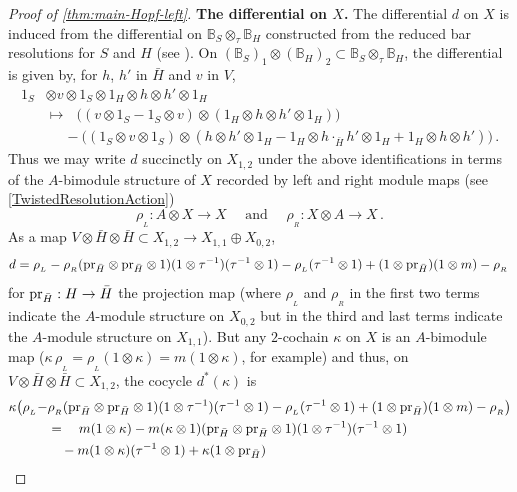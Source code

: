 \documentclass[11pt]{amsart}
\numberwithin{equation}{section}
\newcommand{\X}{_X}
\newcommand{\gammax}{\kappa} %
\newcommand{\pr}{ {\rm{pr}} }%
\newcommand{\BB}{\mathbb{B}} %
\newcommand{\itau}{{\tau^{-1}}}%
\renewcommand{\_}[1]{\mbox{$_{\left( #1 \right)}$}}
\newcommand{\ot}{\otimes}
\newcommand{\ott}{\otimes_{\tau}}
\begin{document}
{\begin{proof}[Proof of \cref{thm:main-Hopf-left}]
{\bf The differential on $X$.}
The differential $d$ on
$X$ is induced
from the differential on
$\BB_S\ott \BB_H$ constructed from the reduced bar resolutions for $S$
and $H$ (see \cite{TTP-AWEZ}).
On $(\BB_S)_1\ot (\BB_H)_2\subset \BB_S\ott \BB_H$,
the differential is given by,
for $h$, $h'$ in $\bar H$ and $v$ in $V$,
$$
\begin{aligned}
 1_S &\ot v\ot 1_S \ot 1_H \ot h\ot h'\ot 1_H
  \\& \longmapsto\ \ \
\big( (v\ot 1_S-1_S\ot v) \ot (1_H\ot h\ot h'\ot 1_H)\big) 
\\&\ \ \ \ \ \
-\big( (1_S\ot v\ot 1_S)\ot (h\ot h'\ot 1_H 
- 1_H\ot h\cdot_{\bar H} h'\ot 1_H+1_H\ot h\ot h')\big)
\, .
\end{aligned}
$$
%
Thus we may write $d$ succinctly on $X_{1,2}$ under the above
identifications
in terms of the $A$-bimodule structure of $X$ recorded by 
left and right module maps
(see \cref{TwistedResolutionAction})
$$\rho_{_L}:A\ot X\rightarrow X
\quad\text{ and }\quad
\rho_{_R}: X\ot A\rightarrow X
\, .
$$
As a map $V\ot \bar H\ot \bar H\subset X_{1,2}\rightarrow
X_{1,1}\oplus X_{0,2}$,
\begin{equation}\label{d}
\begin{aligned}
  d =
  \rho_{_L}-
  \rho_{_R}(\pr_{\bar H}\ot \pr_{\bar H}\ot 1)
  (1\ot\itau)(\itau\ot 1) 
  - \rho_{_L}(\itau\ot 1)+ (1\ot \pr_{\bar H})
  ( 1\ot m)-\rho_{_R} 
\, 
\end{aligned}
\end{equation}
for $\pr_{\bar H}: H\rightarrow \bar H$ the projection map
(where $\rho_{_L}$ and $\rho_{_R}$ in the first two terms
indicate the $A$-module structure on $X_{0,2}$
but in the third and last terms
indicate the $A$-module structure on $X_{1,1}$).
But any $2$-cochain $\gammax$ on $X$
is an $A$-bimodule map
($\gammax\,\rho_{_L}=\rho_{_L}(1\ot \gammax) 
=m(1\ot \gammax)$, for example) and 
thus, on $V\ot \bar H\ot \bar H\subset X_{1,2}$,
the cocycle
$d^*(\gammax)$ is
\begin{equation*}
\begin{aligned}
  \gammax \big(\rho_{_L}-
  &
  \rho_{_R} (\pr_{\bar H}\ot \pr_{\bar H}\ot 1)
  (1\ot\itau)(\itau\ot 1) 
  - \rho_{_L}(\itau\ot 1)+ (1\ot \pr_{\bar H})
  (1\ot m)-\rho_{_R} \big) 
\\ &=\ \ \
m(1\ot \gammax)-
m(\gammax\ot 1) (\pr_{\bar H}\ot \pr_{\bar H}\ot 1)
(1\ot\itau)(\itau\ot 1)
\\ & \ \ \
- m(1\ot \gammax)(\itau\ot 1)+\gammax (1\ot \pr_{\bar H})

\end{aligned}
\end{equation*}
\end{proof}}
\end{document}
